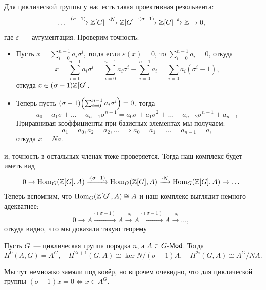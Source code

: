 	Для циклической группы у нас есть такая проективная резольвента: 
	\[
		\ldots \xrightarrow{\cdot (\sigma - 1)} \mathbb{Z}[G] \xrightarrow{\cdot N} \mathbb{Z}[G] \xrightarrow{\cdot (\sigma - 1)} \mathbb{Z}[G] \xrightarrow{\varepsilon} \mathbb{Z} \to 0,
 	\]
 	где $\varepsilon$~--- аугументация. Проверим точность: 
 	\begin{itemize}
 		\item Пусть $x = \sum_{i = 0}^{n - 1} a_i \sigma^{i}$, тогда если $\varepsilon(x) = 0$, то $\sum_{i = 0}^{n - 1} a_i = 0$, откуда 
 		\[
 			x  = \sum_{i = 0}^{n - 1} a_i \sigma^{i}  = \sum_{i = 0}^{n - 1} a_i \sigma^{i}  - \sum_{i = 0}^{n - 1} a_i = \sum_{i = 0} a_i(\sigma^i - 1),
 		\]
 		откуда $x \in (\sigma - 1) \mathbb{Z}[G]$. 

 		\item Теперь пусть $(\sigma - 1) \lr*{\sum_{i = 0}^{n - 1} a_i \sigma^{i}} = 0$, тогда 
 		\[
 			a_0 + a_1 \sigma + \ldots + a_{n - 1}\sigma^{n - 1} = a_0 \sigma + a_1 \sigma^2 + \ldots + a_{n - 2}\sigma^{n - 1} + a_{n - 1} 
 		\]
 		Приравнивая коэффициенты при базисных элементах мы получаем:
 		\[
 			a_1 = a_0, a_2 = a_2, \ldots \implies a_0 = a_1 = \ldots = a_{n - 1} = a,
 		\]
 		откуда $x = Na$. 
 	\end{itemize}

 	и, точность в остальных членах тоже проверяется. Тогда наш комплекс будет иметь вид 
 	\[
 		0 \to \operatorname{Hom}_{G}(\mathbb{Z}[G], A) \xrightarrow{\cdot (\sigma - 1)} \operatorname{Hom}_{G}(\mathbb{Z}[G], A) \xrightarrow{\cdot N} \operatorname{Hom}_{G}(\mathbb{Z}[G], A) \to \ldots 
 	\]
 	Теперь вспомним, что $\operatorname{Hom}_{G}(\mathbb{Z}[G], A) \cong A$ и наш комплекс выглядит немного адекватнее: 
 	\[
 		0 \to A \xrightarrow{\cdot (\sigma - 1)} A  \xrightarrow{\cdot N} A \xrightarrow{\cdot (\sigma - 1)} A \xrightarrow{\cdot N} \ldots,
 	\]
 	откуда видно, что мы доказали такую теорему  

 	\begin{theorem} 
 		Пусть $G$~--- циклическая группа порядка $n$, а $A \in G\text{-}\mathsf{Mod}$. Тогда 
 		\[
 			H^{0}(A, G) = A^G, \quad H^{2i + 1}(G, A) \cong \ker{N}/(\sigma - 1)A, \quad H^{2i}(G, A) \cong A^{G}/N A.
 		\]
 	\end{theorem}

 	\begin{remark}
 		Мы тут немножко замяли под ковёр, но впрочем очевидно, что для циклической группы $(\sigma - 1)x = 0 \Leftrightarrow x \in A^{G}$. 
 	\end{remark}

